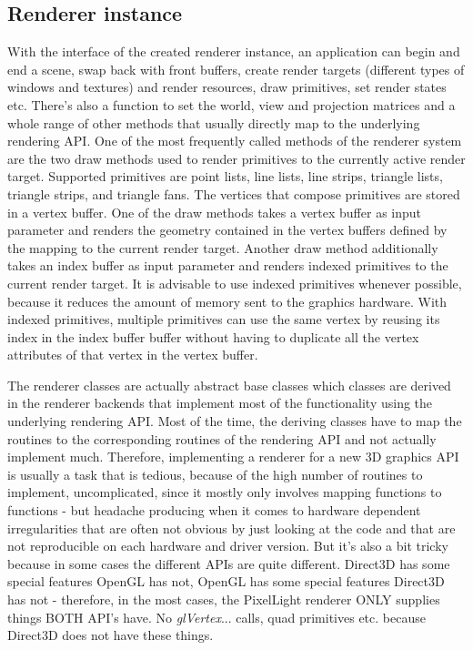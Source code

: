 \subsection{Renderer instance}
With the interface of the created renderer instance, an application can begin and end a scene, swap back with front buffers, create render targets (different types of windows and textures) and render resources, draw primitives, set render states etc. There's also a function to set the world, view and projection matrices and a whole range of other methods that usually directly map to the underlying rendering API. One of the most frequently called methods of the renderer system are the two draw methods used to render primitives to the currently active render target. Supported primitives are point lists, line lists, line strips, triangle lists, triangle strips, and triangle fans. The vertices that compose primitives are stored in a vertex buffer. One of the draw methods takes a vertex buffer as input parameter and renders the geometry contained in the vertex buffers defined by the mapping to the current render target. Another draw method additionally takes an index buffer as input parameter and renders indexed primitives to the current render target. It is advisable to use indexed primitives whenever possible, because it reduces the amount of memory sent to the graphics hardware. With indexed primitives, multiple primitives can use the same vertex by reusing its index in the index buffer buffer without having to duplicate all the vertex attributes of that vertex in the vertex buffer.

The renderer classes are actually abstract base classes which classes are derived in the renderer backends that implement most of the functionality using the underlying rendering API. Most of the time, the deriving classes have to map the routines to the corresponding routines of the rendering API and not actually implement much. Therefore, implementing a renderer for a new 3D graphics API is usually a task that is tedious, because of the high number of routines to implement, uncomplicated, since it mostly only involves mapping functions to functions - but headache producing when it comes to hardware dependent irregularities that are often not obvious by just looking at the code and that are not reproducible on each hardware and driver version. But it's also a bit tricky because in some cases the different APIs are quite different. Direct3D has some special features OpenGL has not, OpenGL has some special features Direct3D has not - therefore, in the most cases, the PixelLight renderer ONLY supplies things BOTH API's have. No \emph{glVertex}... calls, quad primitives etc. because Direct3D does not have these things.




